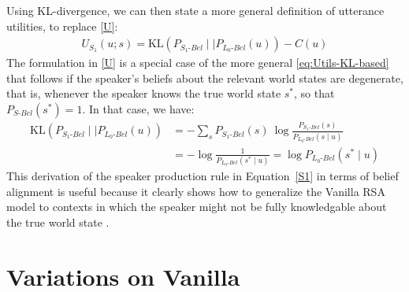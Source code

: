 \documentclass{sp}
\begin{document}
Using KL-divergence, we can then state a more general definition of utterance utilities, to
replace \eqref{U}:
\begin{align}
  \label{eq:Utils-KL-based}
  U_{S_1}(u; s) = \text{KL}(P_{S_{1}\text{-}Bel} \mid \mid P_{L_{0}\text{-}Bel}(u)) - C(u)
\end{align}
The formulation in \eqref{U} is a special case of the more general \eqref{eq:Utils-KL-based}
that follows if the speaker's beliefs about the relevant world states are degenerate, that is,
whenever the speaker knows the true world state $s^{*}$, so that $P_{S\text{-}Bel}(s^{*})=1$.
In that case, we have:
\begin{align*}
  \text{KL}(P_{S_{1}\text{-}Bel} \mid \mid P_{L_{0}\text{-}Bel}(u)) & = - \sum_{s} P_{S_{1}\text{-}Bel}(s) \ \log \frac{P_{S_{1}\text{-}Bel}(s)}{P_{L_{0}\text{-}Bel}(s \mid u)} \\
  & =  - \log\frac{1}{P_{L_{0}\text{-}Bel}(s^* \mid u)} = \log P_{L_{0}\text{-}Bel}(s^* \mid u)
\end{align*}
This derivation of the speaker production rule in Equation~\eqref{S1} in terms of belief alignment is useful because it clearly shows how to generalize the Vanilla RSA model to contexts in which the speaker might not be fully knowledgable about the true world state \citep{goodmanstuhlmuller2013,HerbstrittFranke2019:Complex-probabi}.

\section{Variations on Vanilla} \label{variations}
\end{document}
